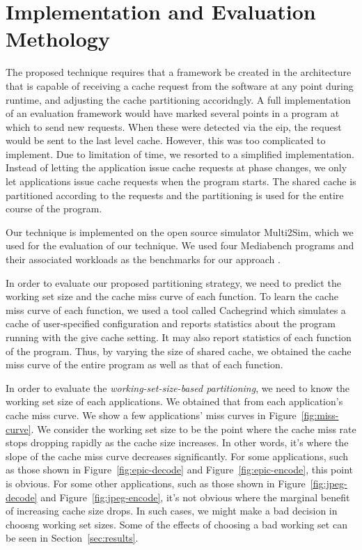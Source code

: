 \documentclass{acm_proc_article-sp}
\begin{document}
\section{Implementation and Evaluation Methology}

The proposed technique requires that a framework be created in the architecture that is capable of
receiving a cache request from the software at any point during runtime, 
and adjusting the cache partitioning accoridngly. A full implementation of an evaluation framework would 
have marked several points in a program at which to send new requests. When these were detected
via the eip, the request would be sent to the last level cache. However, this was too complicated to implement. Due to limitation of time, we resorted to a simplified 
implementation. Instead of letting the application issue cache requests at 
phase changes, we only let applications issue cache requests when the program
starts. The shared cache is partitioned according to the requests and the 
partitioning is used for the entire course of the program.

Our technique is implemented on the open source simulator Multi2Sim, which we used for the
evaluation of our technique. We used four Mediabench programs and their associated workloads as the benchmarks for our approach \cite{mediabench}.

In order to evaluate our proposed partitioning strategy, we need to predict the 
working set size and the cache miss curve of each function. To learn the cache 
miss curve of each function, we used a tool called Cachegrind \cite{cachegrind}
which simulates a cache of user-specified configuration and reports statistics 
about the program running with the give cache setting. It may also report 
statistics of each function of the program. Thus, by varying the size of shared 
cache, we obtained the cache miss curve of the entire program as well as that of
 each function.

In order to evaluate the \emph{working-set-size-based partitioning}, we need to 
know the working set size of each applications. We obtained that from each 
application's cache miss curve. We show a few applications' miss curves in Figure~\ref{fig:miss-curve}. 
We consider the working set size to be the point where the cache miss rate stops dropping rapidly as the cache size increases. In other words, it's where the slope of the cache miss curve decreases 
significantly. For some applications, such as those shown in 
Figure~\ref{fig:epic-decode} and Figure~\ref{fig:epic-encode}, this point is 
obvious. For some other applications, such as those shown in 
Figure~\ref{fig:jpeg-decode} and Figure~\ref{fig:jpeg-encode}, it's not obvious
where the marginal benefit of increasing cache size drops. In such cases, we 
might make a bad decision in choosng working set sizes. Some of the
effects of choosing a bad working set can be seen in Section~\ref{sec:results}.
\end{document}
